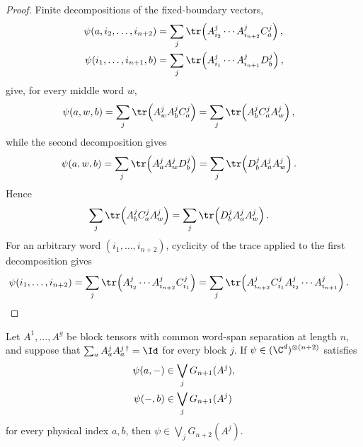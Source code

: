 \begin{proof}
    \leanok
    Finite decompositions of the fixed-boundary vectors,
    \begin{align}
        \psi(a,i_2,\ldots,i_{n+2})
         & =
        \sum_j
        \tr\!\left(A^j_{i_2}\cdots A^j_{i_{n+2}}C^j_a\right), \notag \\
        \psi(i_1,\ldots,i_{n+1},b)
         & =
        \sum_j
        \tr\!\left(A^j_{i_1}\cdots A^j_{i_{n+1}}D^j_b\right), \notag
    \end{align}
    give, for every middle word $w$,
    \begin{align}
        \psi(a,w,b)
         & =
        \sum_j\tr\!\left(A^j_wA^j_bC^j_a\right) =
        \sum_j\tr\!\left(A^j_bC^j_aA^j_w\right), \notag
    \end{align}
    while the second decomposition gives
    \begin{align}
        \psi(a,w,b)
         & =
        \sum_j\tr\!\left(A^j_aA^j_wD^j_b\right) =
        \sum_j\tr\!\left(D^j_bA^j_aA^j_w\right). \notag
    \end{align}
    Hence
    \begin{align}
        \sum_j\tr\!\left(A^j_bC^j_aA^j_w\right)
         & =
        \sum_j\tr\!\left(D^j_bA^j_aA^j_w\right). \notag
    \end{align}
    For an arbitrary word $(i_1,\ldots,i_{n+2})$, cyclicity of the trace applied
    to the first decomposition gives
    \begin{align}
        \psi(i_1,\ldots,i_{n+2})
         & =
        \sum_j
        \tr\!\left(A^j_{i_2}\cdots A^j_{i_{n+2}}C^j_{i_1}\right) =
        \sum_j
        \tr\!\left(A^j_{i_{n+2}}C^j_{i_1}
        A^j_{i_2}\cdots A^j_{i_{n+1}}\right). \notag
    \end{align}
\end{proof}

\begin{lemma}
    \label{lem:block_restrictions_mem_block_ground_spaces}
    \leanok
    Let $A^1,\ldots,A^g$ be block tensors with common word-span separation at
    length $n$, and suppose that
    $\sum_a A^j_aA^{j\,\dagger}_a=\Id$ for every block $j$. If
    $\psi\in(\C^d)^{\otimes(n+2)}$ satisfies
    \begin{align}
        \psi(a,-) & \in\bigvee_jG_{n+1}(A^j),
        \notag                                \\
        \psi(-,b) & \in\bigvee_jG_{n+1}(A^j)
        \notag
    \end{align}
    for every physical index $a,b$, then
    $\psi\in\bigvee_jG_{n+2}(A^j)$.
\end{lemma}

